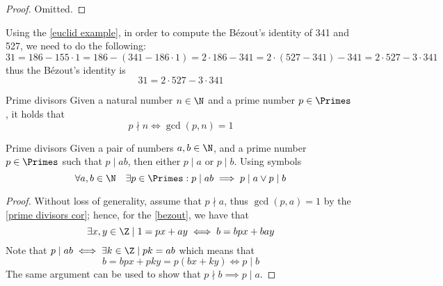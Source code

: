 \documentclass[a4paper, 12pt]{report}
\begin{document}
    \begin{proof}
        Omitted.
    \end{proof}

    \begin{example}
        Using the \cref{euclid example}, in order to compute the Bézout's identity of 341 and 527, we need to do the following: $$31 = 186 - 155 \cdot 1 = 186 - (341 - 186 \cdot 1) = 2 \cdot 186 - 341 = 2 \cdot (527 - 341) - 341 = 2 \cdot 527 - 3 \cdot 341$$ thus the Bézout's identity is $$31 = 2 \cdot 527 - 3\cdot 341$$
    \end{example}

    \begin{framedcor}[label={prime divisors cor}]{Prime divisors}
        Given a natural number $n \in \N$ and a prime number $p \in \Primes$ , it holds that $$p \nmid n \iff \gcd(p, n) = 1$$
    \end{framedcor}


    \begin{framedlem}{Prime divisors}
        Given a pair of numbers $a, b \in \N$, and a prime number $p \in \Primes$ such that $p \mid ab$, then either $p \mid a$ or $p \mid b$. Using symbols $$\forall a, b \in \N \quad \exists p \in \Primes : p \mid ab \implies p \mid a \lor p \mid b$$
    \end{framedlem}

    \begin{proof}
        Without loss of generality, assume that $p \nmid a$, thus $\gcd(p, a) = 1$ by the \cref{prime divisors cor}; hence, for the \cref{bezout}, we have that $$\exists x, y \in \Z \mid 1 = px + ay \iff b = bpx + bay$$ Note that $p \mid ab \iff \exists k \in \Z \mid pk = ab$ which means that $$b = bpx + pky = p(bx+ky) \iff p \mid b$$ The same argument can be used to show that $p \nmid b \implies p \mid a$.
    \end{proof}
\end{document}
